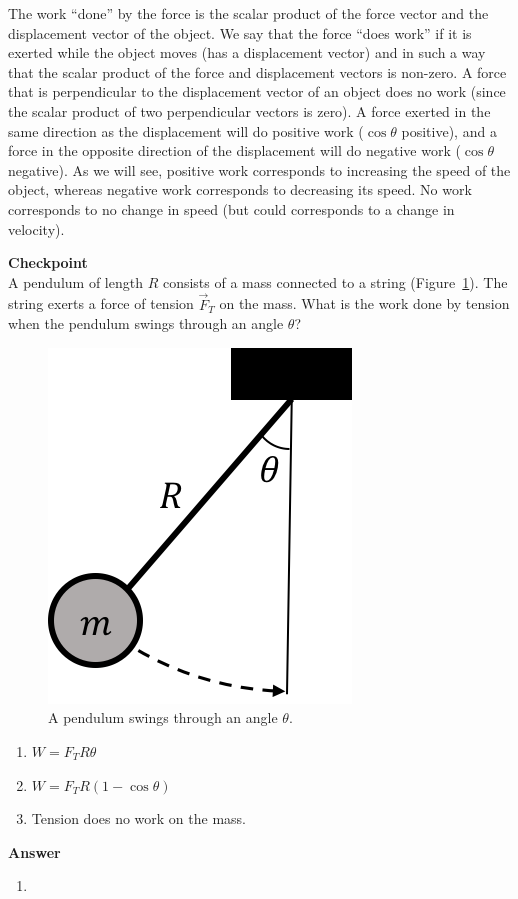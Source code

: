 The work ``done'' by the force is the scalar product of the force vector and the displacement vector of the object. We say that the force ``does work'' if it is exerted while the object moves (has a displacement vector) and in such a way that the scalar product of the force and displacement vectors is non-zero. A force that is perpendicular to the displacement vector of an object does no work (since the scalar product of two perpendicular vectors is zero).  A force exerted in the same direction as the displacement will do positive work ($\cos\theta$ positive), and a force in the opposite direction of the displacement will do negative work ($\cos\theta$ negative). As we will see, positive work corresponds to increasing the speed of the object, whereas negative work corresponds to decreasing its speed. No work corresponds to no change in speed (but could corresponds to a change in velocity).

\begin{framed}
\textbf{Checkpoint}\\
A pendulum of length $R$ consists of a mass connected to a string (Figure~\ref{fig:workenergy:pendulumtension}). The string exerts a force of tension $\vec F_T$ on the mass. What is the work done by tension when the pendulum swings through an angle $\theta$?

\begin{figure}[!htbp]
\centering
\includegraphics[width=0.2\linewidth]{files/pendulumworktension-a90b632f802628285c5f3f9cc394dcae.png}
\caption[]{A pendulum swings through an angle $\theta$.}
\label{fig:workenergy:pendulumtension}
\end{figure}

\begin{enumerate}
\item $W=F_TR\theta$
\item $W=F_TR(1 -\cos\theta)$
\item Tension does no work on the mass.
\end{enumerate}

\begin{framed}
\textbf{Answer}\\
\begin{enumerate}[resume]
\item
\end{enumerate}
\end{framed}
\end{framed}

